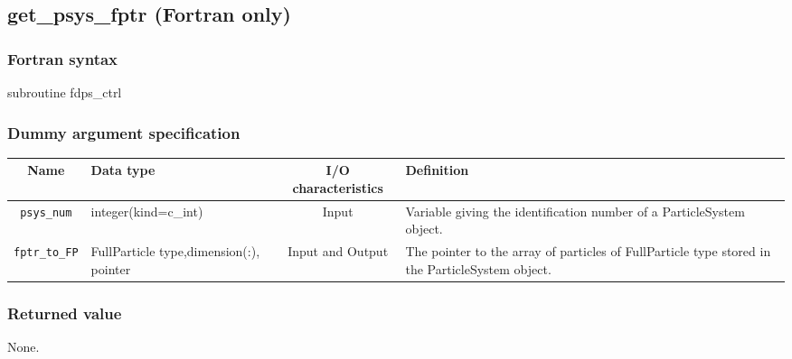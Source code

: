 \clearpage

\subsection{get\_psys\_fptr {\small (Fortran only)}}
\subsubsection*{Fortran syntax}
\begin{screen}
\begin{spverbatim}
subroutine fdps_ctrl%
\end{spverbatim}
\end{screen}


\subsubsection*{Dummy argument specification}
\begin{table}[h]
\begin{tabularx}{\linewidth}{cXcX}
\toprule
\rowcolor{Snow2}
Name & Data type & I/O characteristics & Definition \\
\midrule
\texttt{psys\_num} & integer(kind=c\_int) & Input & Variable giving the identification number of a ParticleSystem object. \\
\texttt{fptr\_to\_FP} & FullParticle type,\newline dimension(:), pointer & Input and Output & The pointer to the array of particles of FullParticle type stored in the ParticleSystem object. \\
\bottomrule
\end{tabularx}
\end{table}

\subsubsection*{Returned value}
None.

